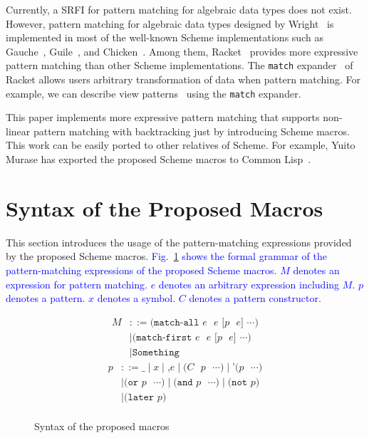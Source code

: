 \documentclass[acmlarge]{acmart}
\newcommand{\todo}[1]{\textcolor{red}{(TODO: #1)}}
\newcommand{\new}[1]{\textcolor{blue}{#1}}
\begin{document}

Currently, a SRFI for pattern matching for algebraic data types does not exist.
However, pattern matching for algebraic data types designed by Wright~\cite{wright1993pattern} is implemented in most of the well-known Scheme implementations such as Gauche~\cite{gauchePM}, Guile~\cite{guilePM}, and Chicken~\cite{chickenPM}.
Among them, Racket~\cite{plt-tr1} provides more expressive pattern matching than other Scheme implementations.
The \lstinline{match} expander~\cite{tobin2011extensible} of Racket allows users arbitrary transformation of data when pattern matching.
For example, we can describe view patterns~\cite{wadler1987views} using the \lstinline{match} expander.

This paper implements more expressive pattern matching that supports non-linear pattern matching with backtracking just by introducing Scheme macros.
This work can be easily ported to other relatives of Scheme.
For example, Yuito Murase has exported the proposed Scheme macros to Common Lisp~\cite{egisonLisp}.


\section{Syntax of the Proposed Macros}\label{usage}

This section introduces the usage of the pattern-matching expressions provided by the proposed Scheme macros.
\new{
Fig.~\ref{fig:syntax} shows the formal grammar of the pattern-matching expressions of the proposed Scheme macros.
$M$ denotes an expression for pattern matching.
$e$ denotes an arbitrary expression including $M$.
$p$ denotes a pattern.
$x$ denotes a symbol.
$C$ denotes a pattern constructor.
}%

\begin{figure}[h]
  \vspace{-3mm}
\begin{multicols}{2}
\noindent
\begin{align*}
M &::= \texttt{(match-all $e$ $e$ [$p$ $e$] $\cdots$)} \\
&\mid \texttt{(match-first $e$ $e$ [$p$ $e$] $\cdots$)} \\
&\mid \texttt{Something}
\end{align*}
\columnbreak
\begin{align*}
p &::= \texttt{_} \mid \texttt{$x$} \mid \texttt{,$e$} \mid \texttt{($C$ $p$ $\cdots$)} \mid \texttt{'($p$ $\cdots$)} \\
&\mid \texttt{(or $p$ $\cdots$)} \mid \texttt{(and $p$ $\cdots$)} \mid \texttt{(not $p$)} \\
&\mid \texttt{(later $p$)} \\
\end{align*}
\end{multicols}
  \vspace{-8mm}
  \caption{Syntax of the proposed macros}
  \label{fig:syntax}
\end{figure}
\end{document}
